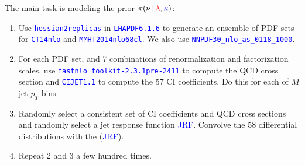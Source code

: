 \documentclass[t,professionalfonts,handout, xcolor=pdftex,dvipsnames,table]{beamer}
\newcommand{\rlambda}{\textcolor{red}{\lambda}}
\newcommand{\bkappa}{\textcolor{blue}{\kappa}}
\begin{document}
\begin{frame}
The main task is modeling the prior $ \pi(\nu  \, | \,  \rlambda, \bkappa) $:
\begin{enumerate}
\item Use \textcolor{blue}{\tt hessian2replicas} in \textcolor{blue}{\tt LHAPDF6.1.6} to generate an ensemble of PDF sets for \textcolor{blue}{\tt CT14nlo} and \textcolor{blue}{\tt MMHT2014nlo68cl}. We also use
\textcolor{blue}{\tt NNPDF30\_nlo\_as\_0118\_1000}.
\item For each PDF set, and 7 combinations of renormalization and factorization scales, use 
\textcolor{blue}{\tt fastnlo\_toolkit-2.3.1pre-2411} to compute the QCD cross section and
 \textcolor{blue}{\tt CIJET1.1} to compute the 57 CI
coefficients. Do this for  each of  $M$ jet $p_{T}$ bins. 
\item Randomly select a consistent set of  CI coefficients and QCD cross sections and  randomly select 
a jet response function \textcolor{blue}{JRF}. Convolve the 58 differential distributions with the (\textcolor{blue}{JRF}). 
\item Repeat 2 and 3 a few hundred times.
\end{enumerate}
\end{frame}

\end{document}
